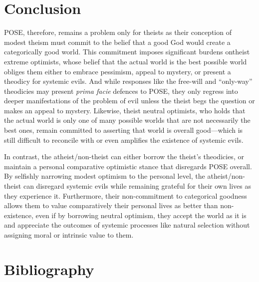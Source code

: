 \section*{Conclusion}

POSE, therefore, remains a problem only for theists as their conception
of modest theism must commit to the belief that a good God would create
a categorically good world. This commitment imposes significant burdens
ontheist extreme optimists, whose belief that the actual world is the
best possible world obliges them either to embrace pessimism, appeal to
mystery, or present a theodicy for systemic evils. And while responses
like the free-will and ``only-way'' theodicies may present \emph{prima
facie} defences to POSE, they only regress into deeper manifestations of
the problem of evil unless the theist begs the question or makes an
appeal to mystery. Likewise, theist neutral optimists, who holds that
the actual world is only one of many possible worlds that are not
necessarily the best ones, remain committed to asserting that world is
overall good---which is still difficult to reconcile with or even
amplifies the existence of systemic evils.

In contrast, the atheist/non-theist can either borrow the
theist's theodicies, or maintain a personal comparative optimistic
stance that disregards POSE overall. By selfishly narrowing modest
optimism to the personal level, the atheist/non-theist can disregard
systemic evils while remaining grateful for their own lives as they
experience it. Furthermore, their non-commitment to categorical goodness
allows them to value comparatively their personal lives as better than
non-existence, even if by borrowing neutral optimism, they accept the
world as it is and appreciate the outcomes of systemic processes like
natural selection without assigning moral or intrinsic value to them.


\newpage  
\section*{Bibliography}


